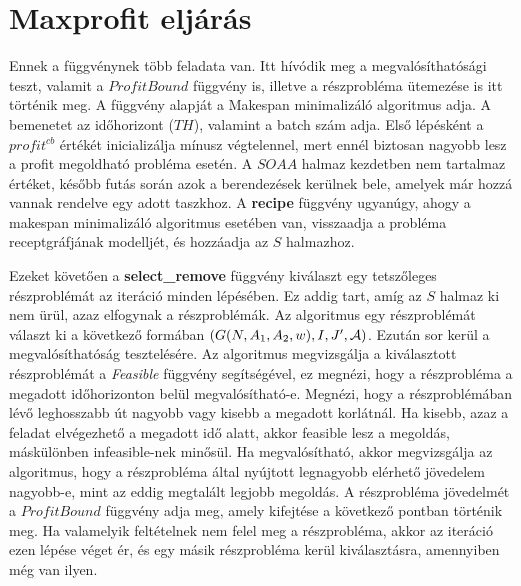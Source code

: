 \section{Maxprofit eljárás}
Ennek a függvénynek több feladata van.
Itt hívódik meg a megvalósíthatósági teszt, valamit a $ProfitBound$ függvény is, illetve a részprobléma ütemezése is itt történik meg.
A függvény alapját a Makespan minimalizáló algoritmus adja.
A bemenetet az időhorizont ($TH$), valamint a batch szám adja.
Első lépésként a $profit^{cb}$ értékét inicializálja mínusz végtelennel, mert ennél biztosan nagyobb lesz a profit megoldható probléma esetén.
A $SOAA$ halmaz kezdetben nem tartalmaz értéket, később futás során azok a berendezések kerülnek bele, amelyek már hozzá vannak rendelve egy adott taszkhoz.
A \textbf{recipe} függvény ugyanúgy, ahogy a makespan minimalizáló algoritmus esetében van, visszaadja a probléma receptgráfjának modelljét, és hozzáadja az $S$ halmazhoz.

Ezeket követően a \textbf{select\_remove} függvény kiválaszt egy tetszőleges részproblémát az iteráció minden lépésében.
Ez addig tart, amíg az $S$ halmaz ki nem ürül, azaz elfogynak a részproblémák.
Az algoritmus egy részproblémát választ ki a következő formában $(G(N,A_1,A_2,w),I,J',{\cal A})$.
Ezután sor kerül a megvalósíthatóság tesztelésére.
Az algoritmus megvizsgálja a kiválasztott részproblémát a \textit{Feasible} függvény segítségével, ez megnézi, hogy a részprobléma a megadott időhorizonton belül megvalósítható-e.
Megnézi, hogy a részproblémában lévő leghosszabb út nagyobb vagy kisebb a megadott korlátnál.
Ha kisebb, azaz a feladat elvégezhető a megadott idő alatt, akkor feasible lesz a megoldás, máskülönben infeasible-nek minősül.
Ha megvalósítható, akkor megvizsgálja az algoritmus, hogy a részprobléma által nyújtott legnagyobb elérhető jövedelem nagyobb-e, mint az eddig megtalált legjobb megoldás.
A részprobléma jövedelmét a $ProfitBound$ függvény adja meg, amely kifejtése a következő pontban történik meg.
Ha valamelyik feltételnek nem felel meg a részprobléma, akkor az iteráció ezen lépése véget ér, és egy másik részprobléma kerül kiválasztásra, amennyiben még van ilyen.

